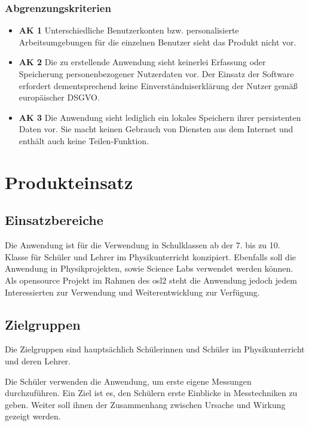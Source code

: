 \documentclass[parskip=full]{scrartcl}
\begin{document}
\subsubsection{Abgrenzungskriterien}

\begin{itemize}
	
	\item \textbf{AK 1} Unterschiedliche Benutzerkonten bzw. personalisierte Arbeitsumgebungen  für die einzelnen Benutzer sieht das Produkt nicht vor. 	
	
	\item \textbf{AK 2} Die zu erstellende Anwendung sieht keinerlei Erfassung oder Speicherung personenbezogener Nutzerdaten vor. Der Einsatz der Software erfordert dementsprechend keine Einverständniserklärung der Nutzer gemäß europäischer \gls{DSGVO}.
	
	\item \textbf{AK 3} Die Anwendung sieht lediglich ein lokales Speichern ihrer persistenten Daten vor. Sie macht keinen Gebrauch von Diensten aus dem Internet und enthält auch keine Teilen-Funktion.
	
	
\end{itemize}

\clearpage
\section{Produkteinsatz}\label{produkteinsatz}

\subsection{Einsatzbereiche}

Die Anwendung ist für die Verwendung in Schulklassen ab der 7. bis zu 10. Klasse für Schüler und Lehrer im Physikunterricht konzipiert. Ebenfalls soll die Anwendung in Physikprojekten, sowie \gls{Science Labs} verwendet werden können. 
Als \gls{opensource} Projekt im Rahmen des \gls{osl2} steht die Anwendung jedoch jedem Interessierten zur Verwendung und Weiterentwicklung zur Verfügung.


\subsection{Zielgruppen}

Die Zielgruppen sind hauptsächlich Schülerinnen und Schüler im Physikunterricht und deren Lehrer. 

Die Schüler verwenden die Anwendung, um erste eigene Messungen durchzuführen. Ein Ziel ist es, den Schülern erste Einblicke in Messtechniken zu geben. Weiter soll ihnen der Zusammenhang zwischen Ursache und Wirkung gezeigt werden. 
\end{document}
